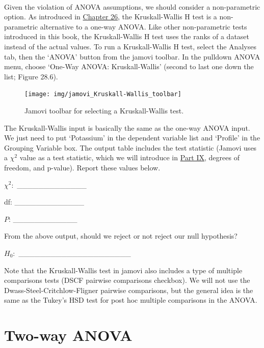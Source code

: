 \documentclass[
]{scrbook}
\begin{document}
\begin{verbatim}


\end{verbatim}

Given the violation of ANOVA assumptions, we should consider a non-parametric option.
As introduced in \protect\hyperlink{Chapter_26}{Chapter 26}, the Kruskall-Wallis H test is a non-parametric alternative to a one-way ANOVA.
Like other non-parametric tests introduced in this book, the Kruskall-Wallis H test uses the ranks of a dataset instead of the actual values.
To run a Kruskall-Wallis H test, select the Analyses tab, then the `ANOVA' button from the jamovi toolbar.
In the pulldown ANOVA menu, choose `One-Way ANOVA: Kruskall-Wallis' (second to last one down the list; Figure 28.6).

\begin{figure}
\texttt{[image: img/jamovi\_Kruskall-Wallis\_toolbar]} \caption{Jamovi toolbar for selecting a Kruskall-Wallis test.}\label{fig:unnamed-chunk-132}
\end{figure}

The Kruskall-Wallis input is basically the same as the one-way ANOVA input.
We just need to put `Potassium' in the dependent variable list and `Profile' in the Grouping Variable box.
The output table includes the test statistic (Jamovi uses a \(\chi^{2}\) value as a test statistic, which we will introduce in \protect\hyperlink{Week9}{Part IX}, degrees of freedom, and p-value).
Report these values below.

\(\chi^{2}:\) \_\_\_\_\_\_\_\_\_\_\_\_\_

df: \_\_\_\_\_\_\_\_\_\_\_\_\_

\(P\): \_\_\_\_\_\_\_\_\_\_\_\_

From the above output, should we reject or not reject our null hypothesis?

\(H_{0}:\) \_\_\_\_\_\_\_\_\_\_\_\_\_\_\_\_\_\_\_\_\_

Note that the Kruskall-Wallis test in jamovi also includes a type of multiple comparisons tests (DSCF pairwise comparisons checkbox).
We will not use the Dwass-Steel-Critchlow-Fligner pairwise comparisons, but the general idea is the same as the Tukey's HSD test for post hoc multiple comparisons in the ANOVA.

\hypertarget{two-way-anova}{%
\section{Two-way ANOVA}\label{two-way-anova}}
\end{document}
